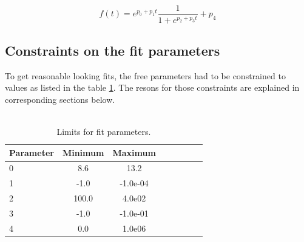 \documentclass[12pt,epsfig]{article}
\begin{document}
\begin{equation}
    \label{T0fit}
    f(t) = e^{p_0 + p_1t} \frac{1}{1 + e^{p_2 + p_3t}}  + p_4
\end{equation}



\subsection{Constraints on the fit parameters}
To get reasonable looking fits, the free parameters had to be constrained to values as listed in
the table \ref{tabParLimits}. The resons for those constraints are explained in corresponding 
sections below.
\\
\\
\begin{table}%
\centering
\begin{tabular}{l*{6}{c}r}

Parameter         & Minimum & Maximum \\
\hline
0                 & 8.6   & 13.2     \\
1                 & -1.0  & -1.0e-04 \\
2                 & 100.0 & 4.0e02   \\
3                 & -1.0  & -1.0e-01 \\
4                 & 0.0   & 1.0e06   \\
\hline
\end{tabular}
\caption{Limits for fit parameters.}   \label{tabParLimits}
\end{table}
\\

\end{document}
